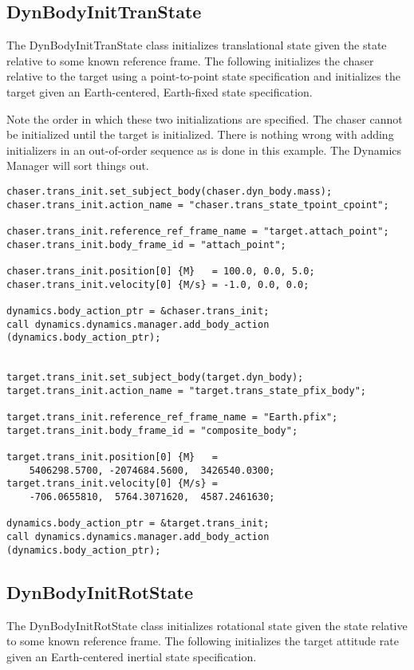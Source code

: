 \subsection{DynBodyInitTranState}
The DynBodyInitTranState class initializes translational state
given the state relative to some known reference frame.
The following initializes the chaser relative to the target
using a point-to-point state specification
and initializes the target given an Earth-centered, Earth-fixed
state specification.

Note the order in which these two initializations are specified.
The chaser cannot be initialized until the target is initialized.
There is nothing wrong with adding initializers in an out-of-order
sequence as is done in this example. The Dynamics Manager will
sort things out.

\begin{verbatim}
chaser.trans_init.set_subject_body(chaser.dyn_body.mass);
chaser.trans_init.action_name = "chaser.trans_state_tpoint_cpoint";

chaser.trans_init.reference_ref_frame_name = "target.attach_point";
chaser.trans_init.body_frame_id = "attach_point";

chaser.trans_init.position[0] {M}   = 100.0, 0.0, 5.0;
chaser.trans_init.velocity[0] {M/s} = -1.0, 0.0, 0.0;

dynamics.body_action_ptr = &chaser.trans_init;
call dynamics.dynamics.manager.add_body_action (dynamics.body_action_ptr);


target.trans_init.set_subject_body(target.dyn_body);
target.trans_init.action_name = "target.trans_state_pfix_body";

target.trans_init.reference_ref_frame_name = "Earth.pfix";
target.trans_init.body_frame_id = "composite_body";

target.trans_init.position[0] {M}   =
    5406298.5700, -2074684.5600,  3426540.0300;
target.trans_init.velocity[0] {M/s} =
    -706.0655810,  5764.3071620,  4587.2461630;

dynamics.body_action_ptr = &target.trans_init;
call dynamics.dynamics.manager.add_body_action (dynamics.body_action_ptr);
\end{verbatim}

\subsection{DynBodyInitRotState}
The DynBodyInitRotState class initializes rotational state
given the state relative to some known reference frame.
The following initializes the target attitude rate
given an Earth-centered inertial state specification.

